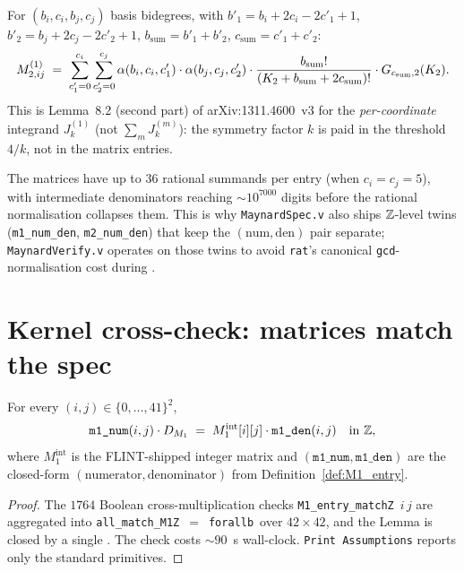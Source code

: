 \begin{definition}[$M_2$ entry]\label{def:M2_entry}
\rocqok
{}
For $(b_i, c_i, b_j, c_j)$ basis bidegrees, with
$b'_1 = b_i + 2c_i - 2c'_1 + 1$, $b'_2 = b_j + 2c_j - 2c'_2 + 1$,
$b_{\mathrm{sum}} = b'_1 + b'_2$, $c_{\mathrm{sum}} = c'_1 + c'_2$:
\[
M_{2, ij}^{(1)} \;=\;
   \sum_{c'_1 = 0}^{c_i} \sum_{c'_2 = 0}^{c_j}
     \alpha(b_i, c_i, c'_1)\cdot \alpha(b_j, c_j, c'_2)
     \cdot \frac{b_{\mathrm{sum}}!}{(K_2 + b_{\mathrm{sum}} + 2 c_{\mathrm{sum}})!}
     \cdot G_{c_{\mathrm{sum}}, 2}(K_2).
\]
This is Lemma~8.2 (second part) of arXiv:1311.4600~v3 for the
\emph{per-coordinate} integrand $J_k^{(1)}$ (not $\sum_m J_k^{(m)}$):
the symmetry factor $k$ is paid in the threshold $4/k$, not in the
matrix entries.
\end{definition}

\begin{remark}
The matrices have up to $36$ rational summands per entry (when
$c_i = c_j = 5$), with intermediate denominators reaching
$\sim 10^{7000}$ digits before the rational normalisation collapses
them. This is why \texttt{MaynardSpec.v} also ships
$\mathbb{Z}$-level twins (\texttt{m1\_num\_den}, \texttt{m2\_num\_den}) that
keep the $(\text{num}, \text{den})$ pair separate; \texttt{MaynardVerify.v}
operates on those twins to avoid \texttt{rat}'s
canonical \texttt{gcd}-normalisation cost during \vmcompute.
\end{remark}

\section{Kernel cross-check: matrices match the spec}

\begin{theorem}\label{thm:M1_match}
\rocqok
{}
For every $(i, j) \in \{0, \ldots, 41\}^2$,
\[
\texttt{m1\_num}(i, j) \cdot D_{M_1}
   \;=\; M_1^{\mathrm{int}}[i][j] \cdot \texttt{m1\_den}(i, j)\quad\text{in }\mathbb{Z},
\]
where $M_1^{\mathrm{int}}$ is the FLINT-shipped integer matrix and
$(\texttt{m1\_num}, \texttt{m1\_den})$ are the closed-form
$(\text{numerator}, \text{denominator})$ from
Definition~\ref{def:M1_entry}.
\end{theorem}
\begin{proof}\rocqok
The $1764$ Boolean cross-multiplication checks
\texttt{M1\_entry\_matchZ}~$i\,j$ are aggregated into
\texttt{all\_match\_M1Z}~$=$~\texttt{forallb}~over $42 \times 42$, and
the Lemma is closed by a single \vmcompute{}. The check costs
${\sim}90$~s wall-clock. \texttt{Print Assumptions} reports only the
standard \Uintsf{} primitives.
\end{proof}

